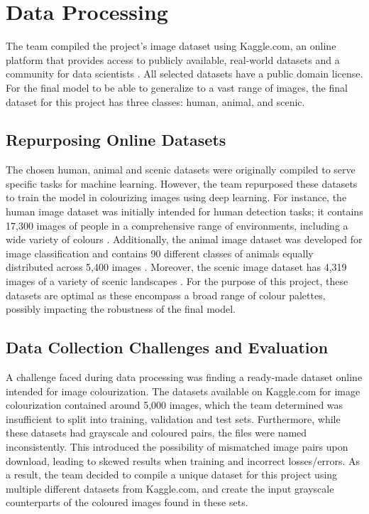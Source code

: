 \documentclass{article} %
\begin{document}
\section{Data Processing}

 The team compiled the project's image dataset using Kaggle.com, an online platform that provides access to publicly available, real-world datasets and a community for data scientists \citep[]{kaggle}. All selected datasets have a public domain license. For the final model to be able to generalize to a vast range of images, the final dataset for this project has three classes: human, animal, and scenic.

 \subsection{Repurposing Online Datasets}

 The chosen human, animal and scenic datasets were originally compiled to serve specific tasks for machine learning. However, the team repurposed these datasets to train the model in colourizing images using deep learning. For instance, the human image dataset was initially intended for human detection tasks; it contains 17,300 images of people in a comprehensive range of environments, including a wide variety of colours \citep[]{kaggle_human}. Additionally, the animal image dataset was developed for image classification and contains 90 different classes of animals equally distributed across 5,400 images \citep[]{kaggle_animal}. Moreover, the scenic image dataset has 4,319 images of a variety of scenic landscapes \citep{kaggle_scene}. For the purpose of this project, these datasets are optimal as these encompass a broad range of colour palettes, possibly impacting the robustness of the final model.

\subsection{Data Collection Challenges and Evaluation}

A challenge faced during data processing was finding a ready-made dataset online intended for image colourization. The datasets available on Kaggle.com for image colourization contained around 5,000 images, which the team determined was insufficient to split into training, validation and test sets. Furthermore, while these datasets had grayscale and coloured pairs, the files were named inconsistently. This introduced the possibility of mismatched image pairs upon download, leading to skewed results when training and incorrect losses/errors. As a result, the team decided to compile a unique dataset for this project using multiple different datasets from Kaggle.com, and create the input grayscale counterparts of the coloured images found in these sets. 
\end{document}
